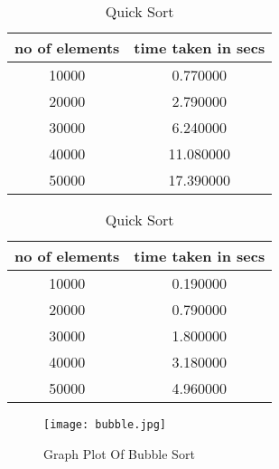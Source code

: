 \documentclass{article}
\begin{document}
%
%
%
% 
%
%
%
\begin{table}[h]
\caption{Bubble Sort}
\centering


\begin{tabular}{|c|c|} 
\hline 
\hline 
no of elements  &  time taken in secs\\ 
\hline 
10000 & 0.770000\\
20000 & 2.790000\\
30000 & 6.240000\\
40000 & 11.080000\\
50000 & 17.390000\\
\hline 
\end{tabular}

\caption{Quick Sort}
\centering
\begin{tabular}{|c|c|}
\hline 
\hline 
no of elements  &  time taken in secs\\ 
\hline
10000 & 0.190000\\
20000 & 0.790000\\
30000 & 1.800000\\
40000 & 3.180000\\
50000 & 4.960000\\
\hline
\end{tabular}
\end{table}
\begin{figure}
\texttt{[image: bubble.jpg]}
\caption{Graph Plot Of Bubble Sort}
\end{figure}
\end{document}
